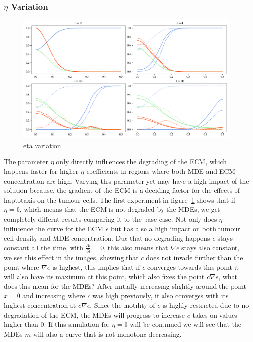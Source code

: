 \subsubsection*{$\eta$ Variation}
\begin{figure}[h]
    \centering
    \includegraphics[width=\textwidth]{resources/images/eta_variation.png}
    \caption{eta variation}
    \label{fig:eta_variation}
\end{figure}
The parameter $\eta$ only directly influences the degrading of the ECM, which happens faster for higher $\eta$ coefficients in regions where both MDE and ECM concentration are high. Varying this parameter yet may have a high impact of the solution because, the gradient of the ECM is a deciding factor for the effects of haptotaxis on the tumour cells. \newline
The first experiment in figure~\ref{fig:eta_variation} shows that if $\eta = 0$, which means that the ECM is not degraded by the MDEs, we get completely differnt results comparing it to the base case. Not only does $\eta$ influcence the curve for the ECM $e$ but has also a high impact on both tumour cell density and MDE concentration. Due that no degrading happens $e$ stays constant all the time, with $\frac{\partial e}{\partial t} = 0$, this also means that $\nabla e$ stays also constant, we see this effect in the images, showing that $c$ does not invade further than the point where $\nabla e$ is highest, this implies that if $c$ converges towards this point it will also have its maximum at this point, which also fixes the point $c\nabla e$, what does this mean for the MDEs? After initially increasing slightly around the point $x=0$ and increasing where $c$ was high previously, it also converges with its highest concentration at $c\nabla e$. Since the motility of $c$ is highly restricted due to no degradation of the ECM, the MDEs will progress to increase $c$ takes on values higher than 0. If this simulation for $\eta=0$ will be continued we will see that the MDEs $m$ will also a curve that is not monotone decreasing.
